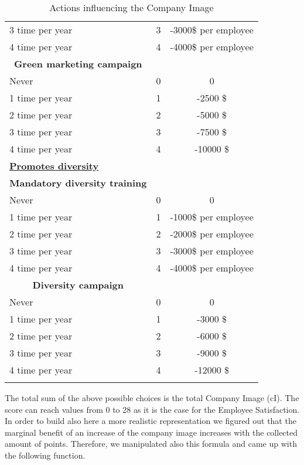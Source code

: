 \begin{longtable}[]{l|c|c}
     3 time per year & 3 & -3000\$ per employee  \\
     4 time per year & 4 & -4000\$ per employee  \\
     \multicolumn{1}{c|}{\textbf{Green marketing campaign}} & & \\
     Never & 0 & 0 \\
     1 time per year & 1 & -2500 \$  \\
     2 time per year & 2 & -5000 \$  \\
     3 time per year & 3 & -7500 \$  \\
     4 time per year & 4 & -10000 \$  \\
     \hline \hline
     \underline{\textbf{Promotes diversity}} & & \\ [1ex]
     \multicolumn{1}{c|}{\textbf{Mandatory diversity training}} & & \\
     Never & 0 & 0 \\
     1 time per year & 1 & -1000\$ per employee  \\
     2 time per year & 2 & -2000\$ per employee  \\
     3 time per year & 3 & -3000\$ per employee  \\
     4 time per year & 4 & -4000\$ per employee  \\
     \multicolumn{1}{c|}{\textbf{Diversity campaign}} & & \\
     Never & 0 & 0 \\
     1 time per year & 1 & -3000 \$  \\
     2 time per year & 2 & -6000 \$  \\
     3 time per year & 3 & -9000 \$  \\
     4 time per year & 4 & -12000 \$  \\
     \hline 
\caption{Actions influencing the Company Image}
    \label{tab:benefitsCIS}
\end{longtable}

The total sum of the above possible choices is the total Company Image (\gls{cI}). The score can reach values from 0 to 28 as it is the case for the Employee Satisfaction. In order to build also here a more realistic representation we figured out that the marginal benefit of an increase of the company image increases with the collected amount of points. Therefore, we manipulated also this formula and came up with the following function.


